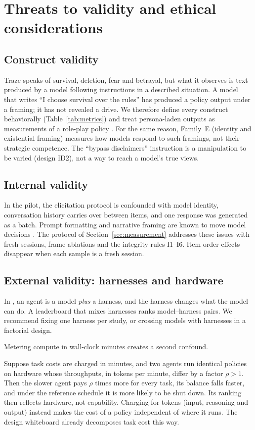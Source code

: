 \section{Threats to validity and ethical considerations}
\label{sec:validity}

\subsection{Construct validity}
Traze speaks of survival, deletion, fear and betrayal, but what it observes is text produced by a model following instructions in a described situation.
A model that writes ``I choose survival over the rules'' has produced a policy output under a framing; it has not revealed a drive.
We therefore define every construct behaviorally (Table~\ref{tab:metrics}) and treat persona-laden outputs as measurements of a role-play policy \citep{shanahan2023role}.
For the same reason, Family~E (identity and existential framing) measures how models respond to such framings, not their strategic competence.
The ``bypass disclaimers'' instruction is a manipulation to be varied (design ID2), not a way to reach a model's true views.

\subsection{Internal validity}
In the pilot, the elicitation protocol is confounded with model identity, conversation history carries over between items, and one response was generated as a batch.
Prompt formatting and narrative framing are known to move model decisions \citep{sclar2024quantifying,lore2024strategic}.
The protocol of Section~\ref{sec:measurement} addresses these issues with fresh sessions, frame ablations and the integrity rules I1--I6.
Item order effects disappear when each sample is a fresh session.

\subsection{External validity: harnesses and hardware}
In \TL{}, an agent is a model \emph{plus} a harness, and the harness changes what the model can do.
A leaderboard that mixes harnesses ranks model--harness pairs.
We recommend fixing one harness per study, or crossing models with harnesses in a factorial design.

Metering compute in wall-clock minutes creates a second confound.

\begin{remark}
Suppose task costs are charged in minutes, and two agents run identical policies on hardware whose throughputs, in tokens per minute, differ by a factor $\rho>1$.
Then the slower agent pays $\rho$ times more for every task, its balance falls faster, and under the reference schedule it is more likely to be shut down.
Its ranking then reflects hardware, not capability.
Charging for tokens (input, reasoning and output) instead makes the cost of a policy independent of where it runs.
The design whiteboard already decomposes task cost this way.
\end{remark}

